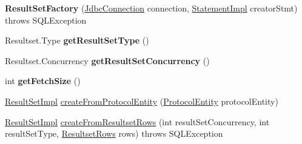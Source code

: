 \begin{DoxyCompactItemize}
\item 
\mbox{\label{classcom_1_1mysql_1_1cj_1_1jdbc_1_1result_1_1_result_set_factory_aa9098e8cd6c53ba10c3de594a9b600d0}} 
{\bfseries Result\+Set\+Factory} (\mbox{\hyperlink{interfacecom_1_1mysql_1_1cj_1_1jdbc_1_1_jdbc_connection}{Jdbc\+Connection}} connection, \mbox{\hyperlink{classcom_1_1mysql_1_1cj_1_1jdbc_1_1_statement_impl}{Statement\+Impl}} creator\+Stmt)  throws S\+Q\+L\+Exception 
\item 
\mbox{\label{classcom_1_1mysql_1_1cj_1_1jdbc_1_1result_1_1_result_set_factory_a09f8de6edd7696e5095a1b04ae26c573}} 
Resultset.\+Type {\bfseries get\+Result\+Set\+Type} ()
\item 
\mbox{\label{classcom_1_1mysql_1_1cj_1_1jdbc_1_1result_1_1_result_set_factory_aec51b1445e56580f9cdaba1427d8b861}} 
Resultset.\+Concurrency {\bfseries get\+Result\+Set\+Concurrency} ()
\item 
\mbox{\label{classcom_1_1mysql_1_1cj_1_1jdbc_1_1result_1_1_result_set_factory_ab49f2c0b4d9ce728f023c3af158cffd9}} 
int {\bfseries get\+Fetch\+Size} ()
\item 
\mbox{\hyperlink{classcom_1_1mysql_1_1cj_1_1jdbc_1_1result_1_1_result_set_impl}{Result\+Set\+Impl}} \mbox{\hyperlink{classcom_1_1mysql_1_1cj_1_1jdbc_1_1result_1_1_result_set_factory_a5638ebeb2a785cacf994cadafbfbaac7}{create\+From\+Protocol\+Entity}} (\mbox{\hyperlink{interfacecom_1_1mysql_1_1cj_1_1protocol_1_1_protocol_entity}{Protocol\+Entity}} protocol\+Entity)
\item 
\mbox{\hyperlink{classcom_1_1mysql_1_1cj_1_1jdbc_1_1result_1_1_result_set_impl}{Result\+Set\+Impl}} \mbox{\hyperlink{classcom_1_1mysql_1_1cj_1_1jdbc_1_1result_1_1_result_set_factory_a30cd3345dd9bdba80ee0ab3f3708da57}{create\+From\+Resultset\+Rows}} (int result\+Set\+Concurrency, int result\+Set\+Type, \mbox{\hyperlink{interfacecom_1_1mysql_1_1cj_1_1protocol_1_1_resultset_rows}{Resultset\+Rows}} rows)  throws S\+Q\+L\+Exception 
\end{DoxyCompactItemize}


